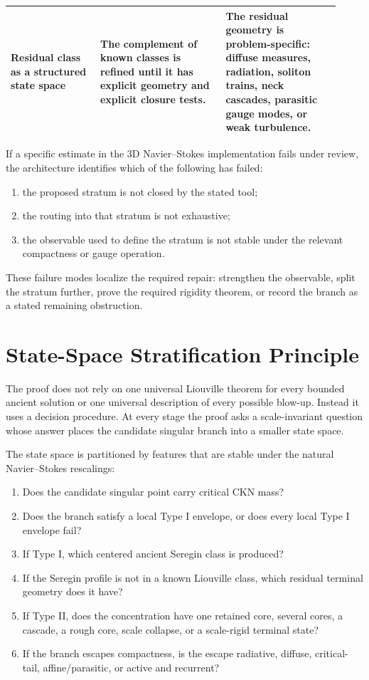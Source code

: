\documentclass[11pt]{amsart}
\begin{document}
\begin{longtable}{@{}>{\raggedright\arraybackslash}p{0.25\linewidth}>{\raggedright\arraybackslash}p{0.35\linewidth}>{\raggedright\arraybackslash}p{0.32\linewidth}@{}}
Residual class as a structured state space & The complement of known classes is refined until it has explicit geometry and explicit closure tests. & The residual geometry is problem-specific: diffuse measures, radiation, soliton trains, neck cascades, parasitic gauge modes, or weak turbulence. \\
\bottomrule
\end{longtable}

If a specific estimate in the 3D Navier--Stokes implementation fails under review, the architecture identifies which of the following has failed:

\begin{enumerate}
\item the proposed stratum is not closed by the stated tool;
\item the routing into that stratum is not exhaustive;
\item the observable used to define the stratum is not stable under the relevant compactness or gauge operation.
\end{enumerate}

These failure modes localize the required repair: strengthen the observable, split the stratum further, prove the required rigidity theorem, or record the branch as a stated remaining obstruction.

\section{State-Space Stratification Principle}

The proof does not rely on one universal Liouville theorem for every bounded ancient solution or one universal description of every possible blow-up.  Instead it uses a decision procedure.  At every stage the proof asks a scale-invariant question whose answer places the candidate singular branch into a smaller state space.

The state space is partitioned by features that are stable under the natural Navier--Stokes rescalings:

\begin{enumerate}
\item Does the candidate singular point carry critical CKN mass?
\item Does the branch satisfy a local Type I envelope, or does every local Type I envelope fail?
\item If Type I, which centered ancient Seregin class is produced?
\item If the Seregin profile is not in a known Liouville class, which residual terminal geometry does it have?
\item If Type II, does the concentration have one retained core, several cores, a cascade, a rough core, scale collapse, or a scale-rigid terminal state?
\item If the branch escapes compactness, is the escape radiative, diffuse, critical-tail, affine/parasitic, or active and recurrent?
\end{enumerate}
\end{document}
